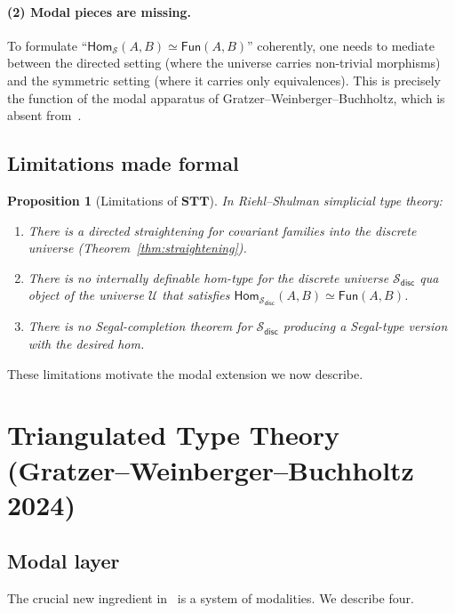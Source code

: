 \documentclass[12pt]{article}
\newtheorem{proposition}[theorem]{Proposition}
\theoremstyle{definition}
\theoremstyle{remark}
\newcommand{\U}{\mathcal{U}}
\newcommand{\Hom}{\mathsf{Hom}}
\newcommand{\Fun}{\mathsf{Fun}}
\newcommand{\eqv}{\simeq}
\newcommand{\disc}{\mathsf{disc}}
\newcommand{\STT}{\mathbf{STT}}
\begin{document}
\paragraph{(2) Modal pieces are missing.}
To formulate ``$\Hom_{\mathcal{S}}(A,B) \eqv \Fun(A,B)$'' coherently, one needs to mediate between the directed setting (where the universe carries non-trivial morphisms) and the symmetric setting (where it carries only equivalences). This is precisely the function of the modal apparatus of Gratzer--Weinberger--Buchholtz, which is absent from~\cite{RiehlShulman}.

\subsection{Limitations made formal}

\begin{proposition}[Limitations of $\STT$]\label{prop:limitations}
In Riehl--Shulman simplicial type theory:
\begin{enumerate}
\item There is a directed straightening for covariant families into the discrete universe (Theorem~\ref{thm:straightening}).
\item There is \emph{no internally definable} hom-type for the discrete universe $\mathcal{S}_{\disc}$ qua object of the universe $\U$ that satisfies $\Hom_{\mathcal{S}_{\disc}}(A,B) \eqv \Fun(A,B)$.
\item There is no Segal-completion theorem for $\mathcal{S}_{\disc}$ producing a Segal-type version with the desired hom.
\end{enumerate}
\end{proposition}

These limitations motivate the modal extension we now describe.

\section[Triangulated Type Theory]{Triangulated Type Theory \\ (Gratzer--Weinberger--Buchholtz 2024)}\label{sec:gwb}

\subsection{Modal layer}

The crucial new ingredient in~\cite{GWB2024} is a system of modalities. We describe four.
\end{document}
